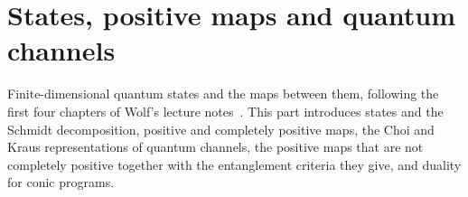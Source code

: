 \part{States, positive maps and quantum channels}
\label{part:states_and_channels}

Finite-dimensional quantum states and the maps between them, following the
first four chapters of Wolf's lecture notes~\cite{Wolf2012Quantum}. This part
introduces states and the Schmidt decomposition, positive and completely
positive maps, the Choi and Kraus representations of quantum channels, the
positive maps that are not completely positive together with the entanglement
criteria they give, and duality for conic programs.
